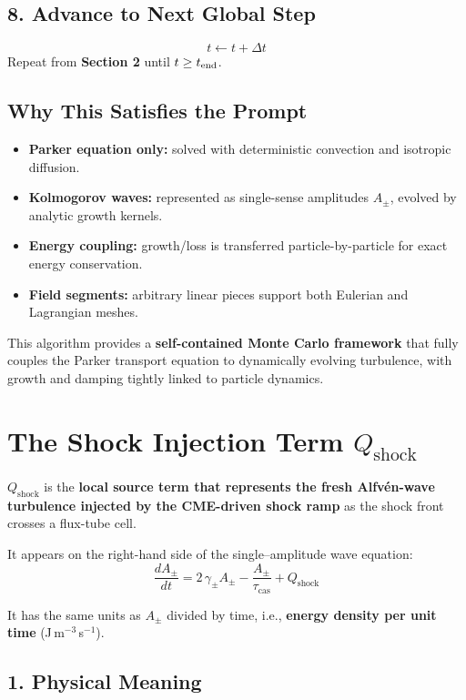 \subsection*{8. Advance to Next Global Step}

\[
t \leftarrow t + \Delta t
\]
Repeat from \textbf{Section 2} until $t \geq t_{\rm end}$.

\subsection*{Why This Satisfies the Prompt}

\begin{itemize}
  \item \textbf{Parker equation only:} solved with deterministic convection and isotropic diffusion.
  \item \textbf{Kolmogorov waves:} represented as single-sense amplitudes $A_\pm$, evolved by analytic growth kernels.
  \item \textbf{Energy coupling:} growth/loss is transferred particle-by-particle for exact energy conservation.
  \item \textbf{Field segments:} arbitrary linear pieces support both Eulerian and Lagrangian meshes.
\end{itemize}

\bigskip

\noindent
This algorithm provides a \textbf{self-contained Monte Carlo framework} that fully couples the Parker transport equation to dynamically evolving turbulence, with growth and damping tightly linked to particle dynamics.


\section*{The Shock Injection Term $Q_{\text{shock}}$}

\textbf{$Q_{\text{shock}}$} is the \textbf{local source term that represents the fresh Alfvén-wave turbulence injected by the CME-driven shock ramp} as the shock front crosses a flux-tube cell.

It appears on the right-hand side of the single–amplitude wave equation:
\[
\frac{dA_\pm}{dt}
= 2\,\gamma_\pm A_\pm
  -\frac{A_\pm}{\tau_{\text{cas}}}
  +\boxed{Q_{\text{shock}}} \tag{1}
\]

It has the same units as $A_\pm$ divided by time, i.e., \textbf{energy density per unit time} (J\,m$^{-3}$\,s$^{-1}$).

\subsection*{1. Physical Meaning}

